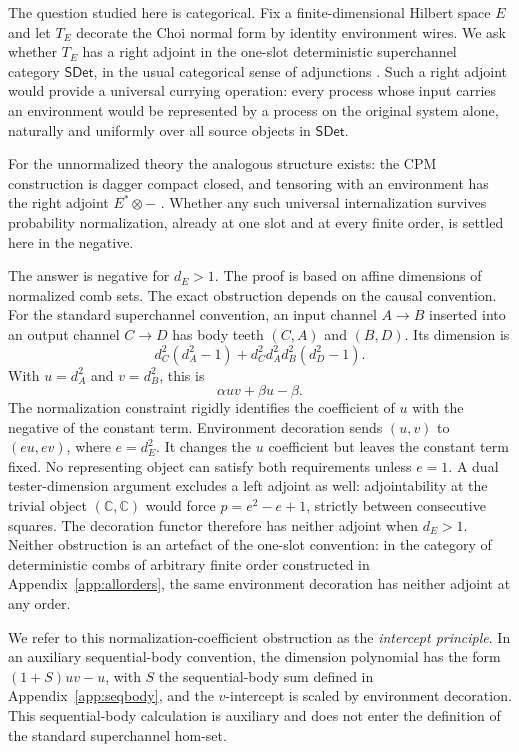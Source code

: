 \documentclass[11pt,a4paper]{article}
\theoremstyle{definition}
\theoremstyle{plain}
\theoremstyle{remark}
\newcommand{\SDet}{\mathsf{SDet}}
\begin{document}
The question studied here is categorical. Fix a finite-dimensional Hilbert space $E$ and let $T_E$ decorate the Choi normal form by identity environment wires. We ask whether $T_E$ has a right adjoint in the one-slot deterministic superchannel category $\SDet$, in the usual categorical sense of adjunctions \cite{macLane1998}. Such a right adjoint would provide a universal currying operation: every process whose input carries an environment would be represented by a process on the original system alone, naturally and uniformly over all source objects in $\SDet$.

For the unnormalized theory the analogous structure exists: the CPM
construction is dagger compact closed, and tensoring with an environment
has the right adjoint $E^*\otimes-$
\cite{selinger2007,coeckekissinger2017}. Whether any such universal
internalization survives probability normalization, already at one slot
and at every finite order, is settled here in the negative.

The answer is negative for $d_E>1$. The proof is based on affine dimensions of normalized comb sets. The exact obstruction depends on the causal convention. For the standard superchannel convention, an input channel $A\to B$ inserted into an output channel $C\to D$ has body teeth $(C,A)$ and $(B,D)$. Its dimension is
\[
 d_C^2(d_A^2-1)+d_C^2d_A^2d_B^2(d_D^2-1).
\]
With $u=d_A^2$ and $v=d_B^2$, this is
\[
 \alpha uv+\beta u-\beta.
\]
The normalization constraint rigidly identifies the coefficient of $u$ with the negative of the constant term. Environment decoration sends $(u,v)$ to $(eu,ev)$, where $e=d_E^2$. It changes the $u$ coefficient but leaves the constant term fixed. No representing object can satisfy both requirements unless $e=1$. A dual tester-dimension argument excludes a left adjoint as well: adjointability at the trivial object $(\mathbb C,\mathbb C)$ would force $p=e^2-e+1$, strictly between consecutive squares. The decoration functor therefore has
neither adjoint when $d_E>1$. Neither obstruction is an artefact of the
one-slot convention: in the category of deterministic combs of
arbitrary finite order constructed in Appendix~\ref{app:allorders},
the same environment decoration has neither adjoint at any order.

We refer to this normalization-coefficient obstruction as the \emph{intercept principle}. In an auxiliary sequential-body convention, the dimension polynomial has the form $(1+S)uv-u$, with $S$ the sequential-body sum defined in Appendix~\ref{app:seqbody}, and the $v$-intercept is scaled by environment decoration. This sequential-body calculation is auxiliary and does not enter the definition of the standard superchannel hom-set.
\end{document}
